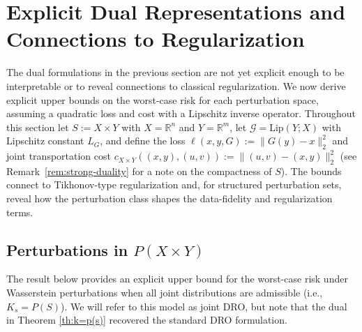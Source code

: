 \documentclass{article}
\newcommand{\R}{\mathbb{R}} %
\theoremstyle{definition}
\theoremstyle{remarksty}
\begin{document}
\section{Explicit Dual Representations and Connections to Regularization}\label{sec:explicit-forms}
The dual formulations in the previous section are not yet explicit enough to be interpretable or to reveal connections to classical regularization. We now derive explicit upper bounds on the worst-case risk for each perturbation space, assuming a quadratic loss and cost with a Lipschitz inverse operator. Throughout this section let $S:=X\times Y$ with $X=\R^n$ and $Y=\R^m$, let $\mathcal{G} = \text{Lip}(Y;X)$ with Lipschitz constant $L_G$, and define the loss $\ell(x,y,G):=\|G(y)-x\|^2_2$ and joint transportation cost $c_{X\times Y}((x,y),(u,v)):= \|(u,v)-(x,y)\|^2_2$ (see Remark~\ref{rem:strong-duality} for a note on the compactness of $S$). The bounds connect to Tikhonov-type regularization and, for structured perturbation sets, reveal how the perturbation class shapes the data-fidelity and regularization terms. 

\subsection{Perturbations in $P(X\times Y)$}\label{sec:joint-perturb}
The result below provides an explicit upper bound for the worst-case risk under Wasserstein perturbations when all joint distributions are admissible (i.e., $K_s=P(S)$). We will refer to this model as joint DRO, but note that the dual in Theorem \ref{th:k=p(s)} recovered the standard DRO formulation.
\end{document}
